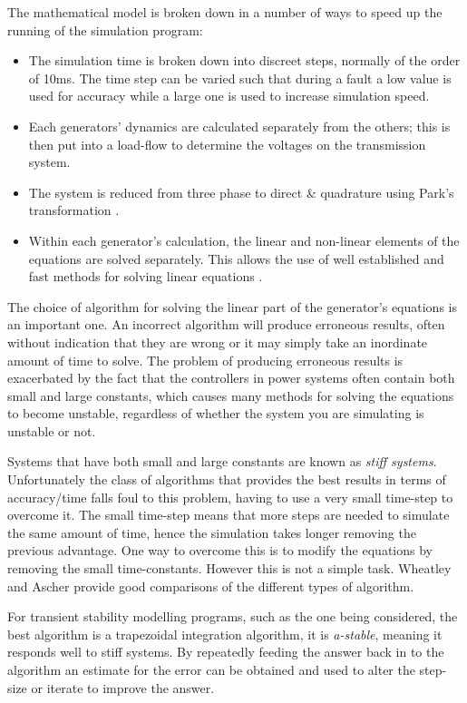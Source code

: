 \documentclass[a4paper,oneside,12pt]{report}
\begin{document}
The mathematical model is broken down in a number of ways to speed up the running of the simulation program:

\begin{itemize}
  \item The simulation time is broken down into discreet steps, normally of the order of 10ms. The time step can be varied such that during a fault a low value is used for accuracy while a large one is used to increase simulation speed.
  \item Each generators' dynamics are calculated separately from the others; this is then put into a load-flow to determine the voltages on the transmission system.
  \item The system is reduced from three phase to direct \& quadrature using Park's transformation \cite{Park1929,Park1933}.
  \item Within each generator's calculation, the linear and non-linear elements of the equations are solved separately. This allows the use of well established and fast methods for solving linear equations \cite{Brenan1987}.
\end{itemize}

The choice of algorithm for solving the linear part of the generator's equations is an important one. An incorrect algorithm will produce erroneous results, often without indication that they are wrong or it may simply take an inordinate amount of time to solve. The problem of producing erroneous results is exacerbated by the fact that the controllers in power systems often contain both small and large constants, which causes many methods for solving the equations to become unstable, regardless of whether the system you are simulating is unstable or not.

Systems that have both small and large constants are known as \emph{stiff systems}. Unfortunately the class of algorithms that provides the best results in terms of accuracy/time falls foul to this problem, having to use a very small time-step to overcome it. The small time-step means that more steps are needed to simulate the same amount of time, hence the simulation takes longer removing the previous advantage. One way to overcome this is to modify the equations by removing the small time-constants. However this is not a simple task. Wheatley \cite{Gerald2003} and Ascher \cite{Ascher1998} provide good comparisons of the different types of algorithm.

For transient stability modelling programs, such as the one being considered, the best algorithm is a trapezoidal integration algorithm, it is \emph{a-stable}, meaning it responds well to stiff systems. By repeatedly feeding the answer back in to the algorithm an estimate for the error can be obtained and used to alter the step-size or iterate to improve the answer.
\end{document}
